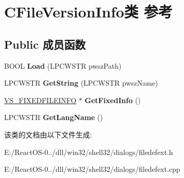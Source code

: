 \hypertarget{class_c_file_version_info}{}\section{C\+File\+Version\+Info类 参考}
\label{class_c_file_version_info}
\subsection*{Public 成员函数}
\begin{DoxyCompactItemize}
\item 
\mbox{\label{class_c_file_version_info_ab7d1e28ad56a17efc2e20b2d9103c45b}} 
B\+O\+OL {\bfseries Load} (L\+P\+C\+W\+S\+TR pwsz\+Path)
\item 
\mbox{\label{class_c_file_version_info_abf130da29424d93df21088e11589f68f}} 
L\+P\+C\+W\+S\+TR {\bfseries Get\+String} (L\+P\+C\+W\+S\+TR pwsz\+Name)
\item 
\mbox{\label{class_c_file_version_info_ad2fb7d2273622e742658584aa1c7fab0}} 
\hyperlink{structtag_v_s___f_i_x_e_d_f_i_l_e_i_n_f_o}{V\+S\+\_\+\+F\+I\+X\+E\+D\+F\+I\+L\+E\+I\+N\+FO} $\ast$ {\bfseries Get\+Fixed\+Info} ()
\item 
\mbox{\label{class_c_file_version_info_afb45314d540bb1933d72f464263b3f37}} 
L\+P\+C\+W\+S\+TR {\bfseries Get\+Lang\+Name} ()
\end{DoxyCompactItemize}


该类的文档由以下文件生成\+:\begin{DoxyCompactItemize}
\item 
E\+:/\+React\+O\+S-\/0../dll/win32/shell32/dialogs/filedefext.\+h\item 
E\+:/\+React\+O\+S-\/0../dll/win32/shell32/dialogs/filedefext.\+cpp\end{DoxyCompactItemize}
